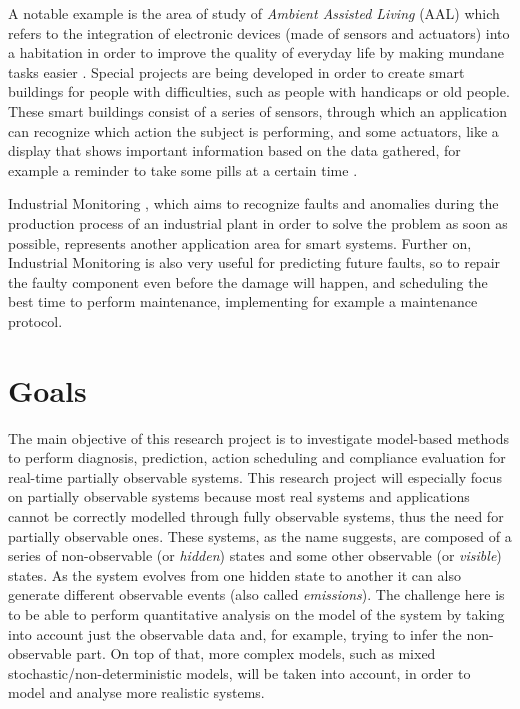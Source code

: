 \documentclass{article}
\begin{document}
        A notable example is the area of study of \textit{Ambient Assisted Living} (AAL) which refers to the integration of electronic devices (made of sensors and actuators) into a habitation in order to improve the quality of everyday life by making mundane tasks easier \cite{wadhawan2005smart, cook2009ambient}. Special projects are being developed in order to create smart buildings for people with difficulties, such as people with handicaps or old people. These smart buildings consist of a series of sensors, through which an application can recognize which action the subject is performing, and some actuators, like a display that shows important information based on the data gathered, for example a reminder to take some pills at a certain time \cite{carnevali2015continuous, epew16}.
        
        Industrial Monitoring \cite{chiang2001fault}, which aims to recognize faults and anomalies during the production process of an industrial plant in order to solve the problem as soon as possible, represents another application area for smart systems. Further on, Industrial Monitoring is also very useful for predicting future faults, so to repair the faulty component even before the damage will happen, and scheduling the best time to perform maintenance, implementing for example a maintenance protocol.
        
    \section*{Goals}
    
        The main objective of this research project is to investigate model-based methods to perform diagnosis, prediction, action scheduling and compliance evaluation for real-time partially observable systems. This research project will especially focus on partially observable systems because most real systems and applications cannot be correctly modelled through fully observable systems, thus the need for partially observable ones. These systems, as the name suggests, are composed of a series of non-observable (or \textit{hidden}) states and some other observable (or \textit{visible}) states. As the system evolves from one hidden state to another it can also generate different observable events (also called \textit{emissions}). The challenge here is to be able to perform quantitative analysis on the model of the system by taking into account just the observable data and, for example, trying to infer the non-observable part. On top of that, more complex models, such as mixed stochastic/non-deterministic models, will be taken into account, in order to model and analyse more realistic systems.
        
\end{document}
